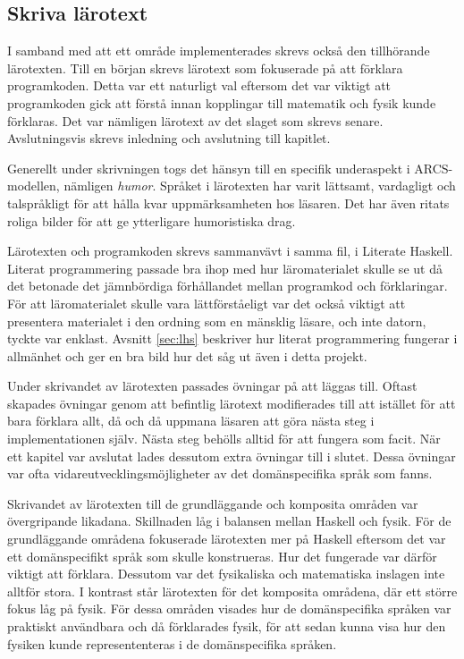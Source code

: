 \begin{draft}
\subsection{Skriva lärotext}

I samband med att ett område implementerades skrevs också den tillhörande
lärotexten. Till en början skrevs lärotext som fokuserade på att förklara
programkoden. Detta var ett naturligt val eftersom det var viktigt att
programkoden gick att förstå innan kopplingar till matematik och fysik kunde
förklaras. Det var nämligen lärotext av det slaget som skrevs senare.
Avslutningsvis skrevs inledning och avslutning till kapitlet.

Generellt under skrivningen togs det hänsyn till en specifik underaspekt i ARCS-modellen, nämligen \textit{humor}. Språket i lärotexten har varit lättsamt, vardagligt och talspråkligt för att hålla kvar uppmärksamheten hos läsaren. Det har även ritats roliga bilder för att ge ytterligare humoristiska drag.

Lärotexten och programkoden skrevs sammanvävt i samma fil, i Literate
Haskell. Literat programmering passade bra ihop med
hur läromaterialet skulle se ut då det betonade det jämnbördiga förhållandet
mellan programkod och förklaringar. För att läromaterialet skulle vara
lättförståeligt var det också viktigt att presentera materialet i den ordning
som en mänsklig läsare, och inte datorn, tyckte var enklast. Avsnitt
\ref{sec:lhs} beskriver hur literat programmering fungerar i allmänhet och ger
en bra bild hur det såg ut även i detta projekt.

Under skrivandet av lärotexten passades övningar på att läggas till. Oftast
skapades övningar genom att befintlig lärotext modifierades till att istället
för att bara förklara allt, då och då uppmana läsaren att göra nästa steg i
implementationen själv. Nästa steg behölls alltid för att fungera som facit. När
ett kapitel var avslutat lades dessutom extra övningar till i slutet. Dessa
övningar var ofta vidareutvecklingsmöjligheter av det domänspecifika språk som
fanns.

Skrivandet av lärotexten till de grundläggande och komposita områden var
övergripande likadana. Skillnaden låg i balansen mellan Haskell och fysik. För
de grundläggande områdena fokuserade lärotexten mer på Haskell eftersom det var
ett domänspecifikt språk som skulle konstrueras. Hur det fungerade var därför
viktigt att förklara. Dessutom var det fysikaliska och matematiska inslagen inte
alltför stora. I kontrast står lärotexten för det komposita områdena, där ett
större fokus låg på fysik. För dessa områden visades hur de domänspecifika
språken var praktiskt användbara och då förklarades fysik, för att sedan kunna
visa hur den fysiken kunde represententeras i de domänspecifika språken.


\end{draft}
